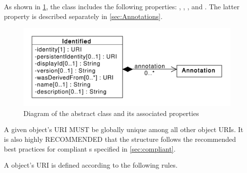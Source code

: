 As shown in \ref{uml:identified}, the  class includes the following properties: , , , and . The latter property is described separately in \ref{sec:Annotations}. 

\begin{figure}[ht]
\begin{center}
\includegraphics[scale=0.6]{uml/identified}
\caption[]{Diagram of the  abstract class and its associated properties}
\label{uml:identified}
\end{center}
\end{figure}

A given  object's URI MUST be globally unique among all other  object URIs. It is also highly RECOMMENDED that the  structure follows the recommended best practices for compliant s specified in \ref{sec:compliant}.

A  object's URI is defined according to the following rules.

